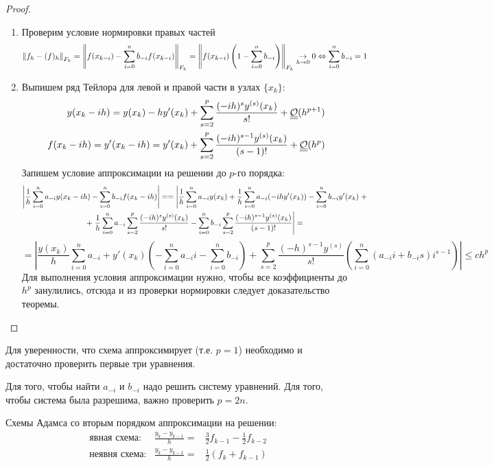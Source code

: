 \begin{proof}
  \begin{enumerate}
    \item Проверим условие нормировки правых частей
          \[\left\lVert f_h-(f)_h\right\rVert_{F_h}=\left\lVert f(x_{k-i})-\sum_{i=0}^nb_{-i}f(x_{k-i})\right\rVert_{F_h}=\left\lVert f(x_{k-i})\left(1-\sum_{i=0}^nb_{-i}\right)\right\rVert_{F_h}\underset{h\rightarrow0}{\rightarrow}0\Leftrightarrow\sum_{i=0}^nb_{-i}=1\]
    \item Выпишем ряд Тейлора для левой и правой части в узлах $\{x_k\}$:
          \begin{align*}
            y(x_k-ih)=y(x_k)-hy'(x_k)+\sum_{s=2}^{p}\frac{(-ih)^{s}y^{(s)}(x_k)}{s!} + \underline{\underline{\mathcal{O}}}(h^{p+1})        \\
            f(x_k-ih)=y'(x_k-ih)=y'(x_k)+\sum_{s=2}^{p}\frac{(-ih)^{s-1}y^{(s)}(x_k)}{(s-1)!} + \underline{\underline{\mathcal{O}}}(h^{p}) \\
          \end{align*}
          Запишем условие аппроксимации на решении до $p$-го порядка:
          \begin{multline*}
            \left\lvert\frac{1}{h}\sum_{i=0}^na_{-i}y(x_k-ih)-\sum_{i=0}^nb_{-i}f(x_k-ih)\right\rvert =
            = \left|\frac{1}{h}\sum_{i=0}^na_{-i}y(x_k)+\frac{1}{h}\sum_{i=0}^na_{-i}(-ihy'(x_k))-\sum_{i=0}^nb_{-i}y'(x_k)\right.+ \\
            +\left.\frac{1}{h}\sum_{i=0}^na_{-i}\sum_{s=2}^{p}\frac{(-ih)^sy^{(s)}(x_k)}{s!}-\sum_{i=0}^nb_{-i}\sum_{s=2}^{p}\frac{(-ih)^{s-1}y^{(s)}(x_k)}{(s-1)!}\right|=
          \end{multline*}
          \[
            =\left|\frac{y(x_k)}{h}\sum_{i=0}^na_{-i}+y'(x_k)\left(-\sum_{i=0}^na_{-i}i-\sum_{i=0}^nb_{-i}\right)
            +\sum_{s=2}^{p}\frac{(-h)^{s-1}y^{(s)}}{s!}\left(\sum_{i=0}^n(a_{-i}i+b_{-i}s)i^{s-1}\right)\right|\leq ch^p
          \]
          Для выполнения условия аппроксимации нужно, чтобы все коэффициенты до $h^p$ занулились, отсюда
          и из проверки нормировки следует доказательство теоремы.
  \end{enumerate}
\end{proof}
\begin{remark}
  Для уверенности, что схема аппроксимирует (т.е. $p = 1$)
  необходимо и достаточно проверить первые три уравнения.

  Для того, чтобы найти $a_{-i}$ и $b_{-i}$ надо решить систему уравнений.
  Для того, чтобы система была разрешима, важно проверить $p=2n$.
\end{remark}
\begin{example}
  Схемы Адамса со вторым порядком аппроксимации на решении:
  \[\begin{array}{ccc}
      \text{явная схема}:  & \frac{y_{k}-y_{k-1}}{h} = & \frac{3}{2}f_{k-1}-\frac{1}{2}f_{k-2}   \\
      \text{неявня схема}: & \frac{y_{k}-y_{k-1}}{h} = & \frac{1}{2}\left({f_{k}+f_{k-1}}\right)
    \end{array}\]
\end{example}


